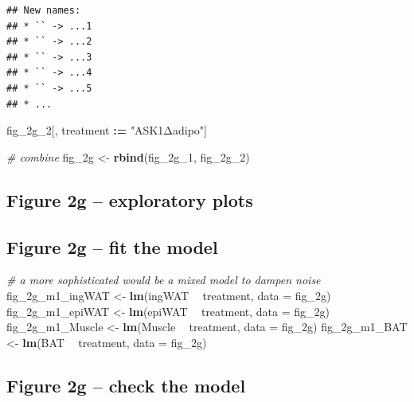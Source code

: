 \documentclass[]{book}
\newenvironment{Shaded}{\begin{snugshade}}{\end{snugshade}}
\newcommand{\CommentTok}[1]{\textcolor[rgb]{0.56,0.35,0.01}{\textit{#1}}}
\newcommand{\DataTypeTok}[1]{\textcolor[rgb]{0.13,0.29,0.53}{#1}}
\newcommand{\DecValTok}[1]{\textcolor[rgb]{0.00,0.00,0.81}{#1}}
\newcommand{\ErrorTok}[1]{\textcolor[rgb]{0.64,0.00,0.00}{\textbf{#1}}}
\newcommand{\KeywordTok}[1]{\textcolor[rgb]{0.13,0.29,0.53}{\textbf{#1}}}
\newcommand{\NormalTok}[1]{#1}
\newcommand{\OperatorTok}[1]{\textcolor[rgb]{0.81,0.36,0.00}{\textbf{#1}}}
\newcommand{\StringTok}[1]{\textcolor[rgb]{0.31,0.60,0.02}{#1}}
\begin{document}
\begin{verbatim}
## New names:
## * `` -> ...1
## * `` -> ...2
## * `` -> ...3
## * `` -> ...4
## * `` -> ...5
## * ...
\end{verbatim}

\begin{Shaded}
\begin{Highlighting}[]
\NormalTok{fig_2g_}\DecValTok{2}\NormalTok{[, treatment }\OperatorTok{:}\ErrorTok{=}\StringTok{ "ASK1Δadipo"}\NormalTok{]}

\CommentTok{# combine}
\NormalTok{fig_2g <-}\StringTok{ }\KeywordTok{rbind}\NormalTok{(fig_2g_}\DecValTok{1}\NormalTok{, fig_2g_}\DecValTok{2}\NormalTok{)}
\end{Highlighting}
\end{Shaded}

\hypertarget{figure-2g-exploratory-plots}{%
\subsection{Figure 2g -- exploratory plots}\label{figure-2g-exploratory-plots}}

\hypertarget{figure-2g-fit-the-model}{%
\subsection{Figure 2g -- fit the model}\label{figure-2g-fit-the-model}}

\begin{Shaded}
\begin{Highlighting}[]
\CommentTok{# a more sophisticated would be a mixed model to dampen noise}
\NormalTok{fig_2g_m1_ingWAT <-}\StringTok{ }\KeywordTok{lm}\NormalTok{(ingWAT }\OperatorTok{~}\StringTok{ }\NormalTok{treatment, }\DataTypeTok{data =}\NormalTok{ fig_2g)}
\NormalTok{fig_2g_m1_epiWAT <-}\StringTok{ }\KeywordTok{lm}\NormalTok{(epiWAT }\OperatorTok{~}\StringTok{ }\NormalTok{treatment, }\DataTypeTok{data =}\NormalTok{ fig_2g)}
\NormalTok{fig_2g_m1_Muscle <-}\StringTok{ }\KeywordTok{lm}\NormalTok{(Muscle }\OperatorTok{~}\StringTok{ }\NormalTok{treatment, }\DataTypeTok{data =}\NormalTok{ fig_2g)}
\NormalTok{fig_2g_m1_BAT <-}\StringTok{ }\KeywordTok{lm}\NormalTok{(BAT }\OperatorTok{~}\StringTok{ }\NormalTok{treatment, }\DataTypeTok{data =}\NormalTok{ fig_2g)}
\end{Highlighting}
\end{Shaded}

\hypertarget{figure-2g-check-the-model}{%
\subsection{Figure 2g -- check the model}\label{figure-2g-check-the-model}}
\end{document}
